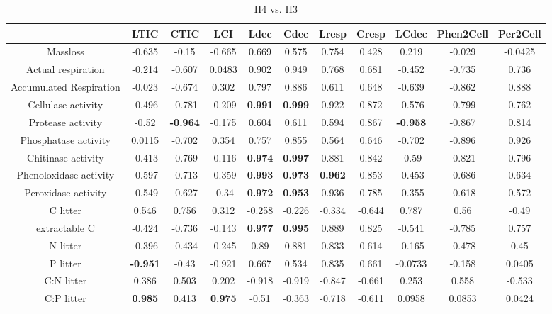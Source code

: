 \documentclass[authoryear,preprint,review,12pt]{elsarticle}
\begin{document}
\begin{table}[h!]
\begin{center}
\caption{H4 vs. H3}
\label{morecorr4}
{\tiny
\begin{tabular}{ccccccccccc}
  \hline
 & LTIC & CTIC & LCI & Ldec & Cdec & Lresp & Cresp & LCdec & Phen2Cell & Per2Cell \\ 
  \hline
Massloss & -0.635 & -0.15 & -0.665 & 0.669 & 0.575 & 0.754 & 0.428 & 0.219 & -0.029 & -0.0425 \\ 
  Actual respiration & -0.214 & -0.607 & 0.0483 & 0.902 & 0.949 & 0.768 & 0.681 & -0.452 & -0.735 & 0.736 \\ 
  Accumulated Respiration & -0.023 & -0.674 & 0.302 & 0.797 & 0.886 & 0.611 & 0.648 & -0.639 & -0.862 & 0.888 \\ 
  Cellulase activity & -0.496 & -0.781 & -0.209 & \textbf{ 0.991 } & \textbf{ 0.999 } & 0.922 & 0.872 & -0.576 & -0.799 & 0.762 \\ 
  Protease activity & -0.52 & \textbf{ -0.964 } & -0.175 & 0.604 & 0.611 & 0.594 & 0.867 & \textbf{ -0.958 } & -0.867 & 0.814 \\ 
  Phosphatase activity & 0.0115 & -0.702 & 0.354 & 0.757 & 0.855 & 0.564 & 0.646 & -0.702 & -0.896 & 0.926 \\ 
  Chitinase activity & -0.413 & -0.769 & -0.116 & \textbf{ 0.974 } & \textbf{ 0.997 } & 0.881 & 0.842 & -0.59 & -0.821 & 0.796 \\ 
  Phenoloxidase activity & -0.597 & -0.713 & -0.359 & \textbf{ 0.993 } & \textbf{ 0.973 } & \textbf{ 0.962 } & 0.853 & -0.453 & -0.686 & 0.634 \\ 
  Peroxidase activity & -0.549 & -0.627 & -0.34 & \textbf{ 0.972 } & \textbf{ 0.953 } & 0.936 & 0.785 & -0.355 & -0.618 & 0.572 \\ 
  C litter & 0.546 & 0.756 & 0.312 & -0.258 & -0.226 & -0.334 & -0.644 & 0.787 & 0.56 & -0.49 \\ 
  extractable C & -0.424 & -0.736 & -0.143 & \textbf{ 0.977 } & \textbf{ 0.995 } & 0.889 & 0.825 & -0.541 & -0.785 & 0.757 \\ 
  N litter & -0.396 & -0.434 & -0.245 & 0.89 & 0.881 & 0.833 & 0.614 & -0.165 & -0.478 & 0.45 \\ 
  P litter & \textbf{ -0.951 } & -0.43 & -0.921 & 0.667 & 0.534 & 0.835 & 0.661 & -0.0733 & -0.158 & 0.0405 \\ 
  C:N litter & 0.386 & 0.503 & 0.202 & -0.918 & -0.919 & -0.847 & -0.661 & 0.253 & 0.558 & -0.533 \\ 
  C:P litter & \textbf{ 0.985 } & 0.413 & \textbf{ 0.975 } & -0.51 & -0.363 & -0.718 & -0.611 & 0.0958 & 0.0853 & 0.0424 \\ 

\end{tabular}}
\end{center}
\end{table}
\end{document}
